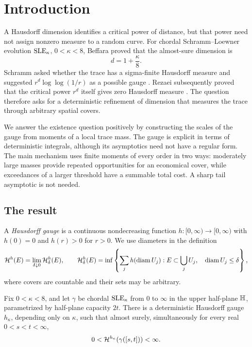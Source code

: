 \section{Introduction}\label{sec:introduction}

A Hausdorff dimension identifies a critical power of distance, but that
power need not assign nonzero measure to a random curve. For chordal
Schramm--Loewner evolution $\mathrm{SLE}_\kappa$, $0<\kappa<8$, Beffara
\cite{Beffara2008} proved that the almost-sure dimension is
\[
 d=1+\frac\kappa8.
\]
Schramm asked whether the trace has a sigma-finite Hausdorff measure
and suggested $r^d\log\log(1/r)$ as a possible gauge
\cite[Problem~7.1 and the following paragraph]{Schramm2006}.
Rezaei subsequently proved that the critical power $r^d$ itself gives
zero Hausdorff measure \cite[Theorem~1.1]{Rezaei2018}.
The question therefore asks for a deterministic refinement of dimension
that measures the trace through arbitrary spatial covers.

We answer the existence question positively by constructing the scales
of the gauge from moments of a local trace mass. The gauge is explicit
in terms of deterministic integrals, although its asymptotics need not
have a regular form. The main mechanism uses finite moments of every
order in two ways: moderately large masses provide repeated opportunities
for an economical cover, while exceedances of a larger threshold have a
summable total cost. A sharp tail asymptotic is not needed.

\subsection{The result}

A \emph{Hausdorff gauge} is a continuous nondecreasing function
$h:[0,\infty)\to[0,\infty)$ with $h(0)=0$ and $h(r)>0$ for $r>0$.
We use diameters in the definition
\[
 \mathcal H^h(E)=\lim_{\delta\downarrow0}\mathcal H^h_\delta(E),\qquad
 \mathcal H^h_\delta(E)=\inf\left\{\sum_j h(\operatorname{diam} U_j):
 E\subset\bigcup_jU_j,\quad\operatorname{diam} U_j\le\delta\right\},
\]
where covers are countable and their sets may be arbitrary.

\begin{theorem}\label{thm:main}
Fix $0<\kappa<8$, and let $\gamma$ be chordal $\mathrm{SLE}_\kappa$ from
$0$ to $\infty$ in the upper half-plane $\mathbb H$, parametrized by half-plane capacity $2t$.
There is a deterministic Hausdorff gauge $h_\kappa$, depending only on
$\kappa$, such that almost surely, simultaneously for every real
$0<s<t<\infty$,
\[
 0<\mathcal H^{h_\kappa}(\gamma([s,t]))<\infty.
\]
\end{theorem}

